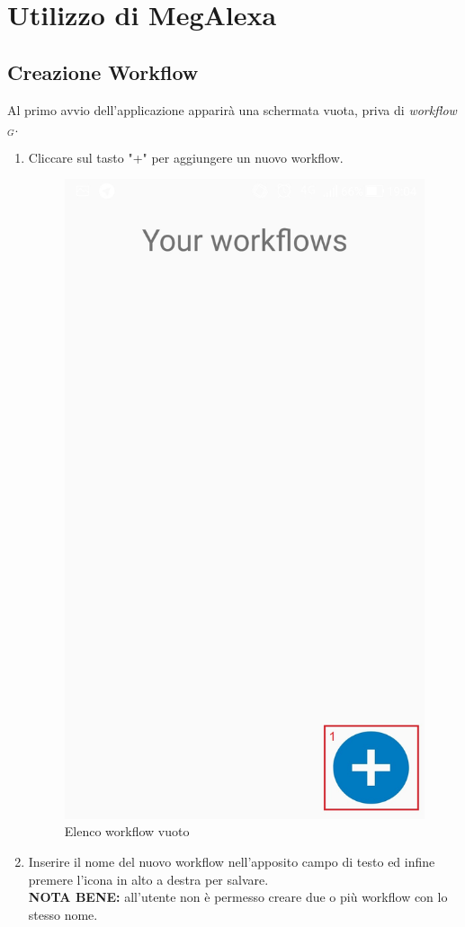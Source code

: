\chapter{Utilizzo di MegAlexa}
\label{utilizzo}

\section{Creazione Workflow}
Al primo avvio dell'applicazione apparirà una schermata vuota, priva di \textit{workflow$_{G}$}.
\begin{enumerate}
\item Cliccare sul tasto "+" per aggiungere un nuovo workflow.
	\begin{figure}[h]
		\centering
		\includegraphics[scale=0.2]{images/HomeWorkflowEmpty.jpg}
		\caption{Elenco workflow vuoto}
	\end{figure}
	\newpage
\item Inserire il nome del nuovo workflow nell'apposito campo di testo ed infine premere l'icona in alto a destra per salvare.\\
\textbf{NOTA BENE:} all'utente non è permesso creare due o più workflow con lo stesso nome.


\end{enumerate}

